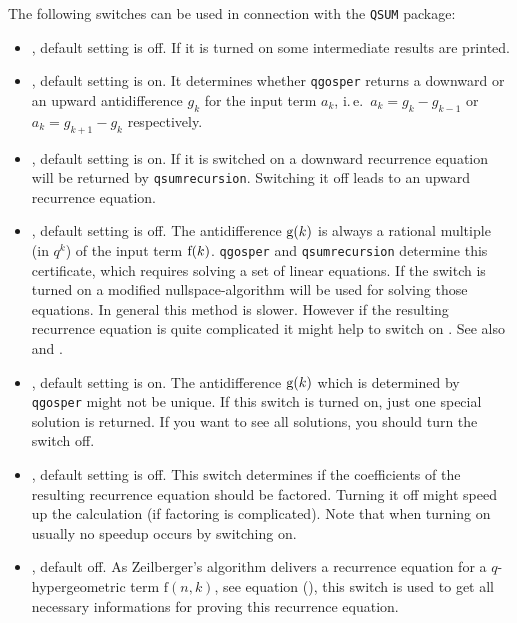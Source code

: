 The following switches can be used in connection with
the \texttt{QSUM} package:
%
\begin{itemize}
	\item {}, default setting is off. If it is
		turned on some intermediate results are printed.
	\item {}, default setting is on. It determines
		whether \texttt{qgosper} returns a downward or an upward
		antidifference $g_k$ for the input term $a_k$,
	   i.\,e.\ $a_k=g_k-g_{k-1}$ or $a_k=g_{k+1}-g_k$ respectively.
	\item {}, default setting is on. If it is
		switched on a downward recurrence equation will be returned by
		\texttt{qsumrecursion}. Switching it off leads to an upward
		recurrence equation.
	\item {}, default setting is off. The
		antidifference ${\mathrm g}(k)$ is always a rational multiple (in $q^k$)
		of the input term ${\mathrm f}(k)$. \texttt{qgosper} and \texttt{qsumrecursion}
		determine this certificate, which requires solving a set of
		linear equations. If the switch  is
		turned on a modified nullspace-algorithm will be used for
		solving those equations. In general this method is slower.
		However if the resulting recurrence equation is quite complicated
		it might help to switch on .
		See also \cite{Knuth:TAoCP2} and \cite{PauleRiese:95}.
	\item {}, default setting is on. The
		antidifference ${\mathrm g}(k)$ which is determined by
		\texttt{qgosper} might not be unique. If this switch is turned on,
		just one special solution is returned. If you want
		to see all solutions, you should turn the switch off.
	\item {}, default setting is off. This
		switch determines if the coefficients of the
		resulting recurrence equation should
		be factored. Turning it off might speed up the calculation
		(if factoring is complicated). Note that
		when turning on  usually no speedup
		occurs by switching  on.
	\item {}, default off.
		As Zeilberger's algorithm
		delivers a recurrence equation for a $q$-hypergeometric term
		$\mathrm{f}(n,k)$, see equation (),
		this switch is used to get all necessary informations for
		proving this recurrence equation.


\end{itemize}
